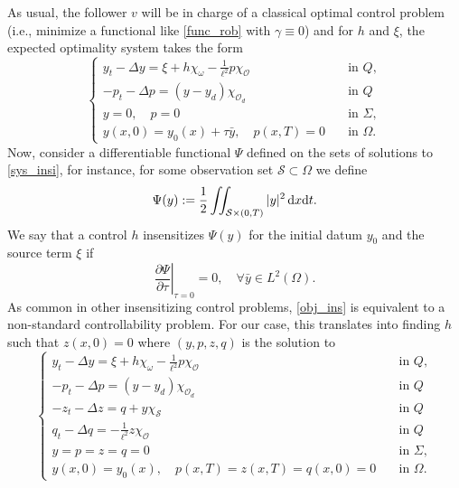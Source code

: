 \documentclass[preprint,10pt]{article}
\numberwithin{equation}{section}
\numberwithin{theorem}{section}
\def\dx{\,\textnormal{d}x}
\def\dt{\textnormal{d}t}
\def\dx{\,\textnormal{d}x}
\def\dt{\textnormal{d}t}
\begin{document}
{\begin{enumerate}
As usual, the follower $v$ will be in charge of a classical optimal control problem (i.e., minimize a functional like \eqref{func_rob} with $\gamma\equiv 0$) and for $h$ and $\xi$, the expected optimality system takes the form
%
\begin{equation}\label{sys_insi}
\begin{cases}
y_t-\Delta y=\xi + h\chi_{\omega}-\frac{1}{\ell^2}p\chi_{\mathcal O} &\quad\text{in }Q, \\ 
-p_t-\Delta p=(y-y_d)\chi_{\mathcal O_d} &\quad\text{in }Q \\
y=0, \quad p=0 &\quad\text{in } \Sigma, \\
y(x,0)=y_0(x)+\tau\bar y, \quad p(x,T)=0  &\quad\text{in } \Omega.
\end{cases}
\end{equation}
%
Now, consider a differentiable functional $\Psi$ defined on the sets of solutions to \eqref{sys_insi}, for instance, for some observation set $\mathcal S\subset \Omega$ we define
%
\begin{equation*}
\Psi(y):= \frac{1}{2}\iint_{\mathcal S\times(0,T)}|y|^2\dx\dt.
\end{equation*}
%
We say that a control $h$ insensitizes $\Psi(y)$ for the initial datum $y_0$ and the source term $\xi$ if
%
\begin{equation}\label{obj_ins}
\left.\frac{\partial\Psi}{\partial\tau}\right|_{\tau=0}=0, \quad \forall \bar y\in L^2(\Omega). 
\end{equation}
%
As common in other insensitizing control problems, \eqref{obj_ins} is equivalent to a non-standard controllability problem. For our case, this translates into finding $h$ such that $z(x,0)=0$ where $(y,p,z,q)$ is the solution to
%
\begin{equation}\label{sys_insi}
\begin{cases}
y_t-\Delta y=\xi + h\chi_{\omega}-\frac{1}{\ell^2}p\chi_{\mathcal O} &\quad\text{in }Q, \\ 
-p_t-\Delta p=(y-y_d)\chi_{\mathcal O_d} &\quad\text{in }Q \\
-z_t-\Delta z= q+y\chi_\mathcal{S} &\quad\text{in }Q \\
q_t-\Delta q=-\frac{1}{\ell^2}z\chi_{\mathcal O} &\quad\text{in }Q \\
y= p=z=q=0 &\quad\text{in } \Sigma, \\
y(x,0)=y_0(x), \quad p(x,T)=z(x,T)=q(x,0)=0  &\quad\text{in } \Omega.
\end{cases}
\end{equation}


\end{enumerate}}
\end{document}
